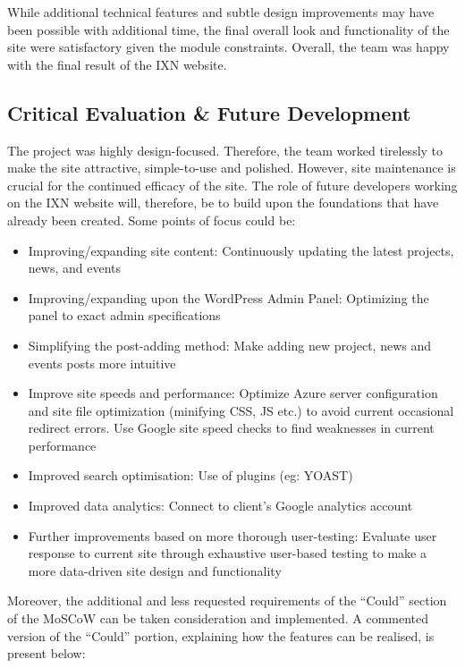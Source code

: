 \documentclass[fontsize=11pt]{extarticle}
\numberwithin{figure}{section} %
\numberwithin{table}{section}%
\providecommand{\tightlist}{%
  \setlength{\itemsep}{0pt}\setlength{\parskip}{0pt}}
\begin{document}
While additional technical features and subtle design improvements may
have been possible with additional time, the final overall look and
functionality of the site were satisfactory given the module
constraints. Overall, the team was happy with the final result of the
IXN website.

\hypertarget{critical-evaluation-future-development}{%
\subsection{Critical Evaluation \& Future
Development}\label{critical-evaluation-future-development}}

The project was highly design-focused. Therefore, the team worked
tirelessly to make the site attractive, simple-to-use and polished.
However, site maintenance is crucial for the continued efficacy of the
site.\cite{g8} The role of future developers working on the IXN website
will, therefore, be to build upon the foundations that have already been
created. Some points of focus could be:

\begin{itemize}
\tightlist
\item
  Improving/expanding site content: Continuously updating the latest
  projects, news, and events
\item
  Improving/expanding upon the WordPress Admin Panel: Optimizing the
  panel to exact admin specifications
\item
  Simplifying the post-adding method: Make adding new project, news and
  events posts more intuitive
\item
  Improve site speeds and performance: Optimize Azure server
  configuration and site file optimization (minifying CSS, JS etc.) to
  avoid current occasional redirect errors. Use Google site speed checks
  to find weaknesses in current performance
\item
  Improved search optimisation: Use of plugins (eg: YOAST)
\item
  Improved data analytics: Connect to client's Google analytics account
\item
  Further improvements based on more thorough user-testing: Evaluate
  user response to current site through exhaustive user-based testing to
  make a more data-driven site design and functionality
\end{itemize}

Moreover, the additional and less requested requirements of the
``Could'' section of the MoSCoW can be taken consideration and
implemented. A commented version of the ``Could'' portion, explaining
how the features can be realised, is present below:
\end{document}

